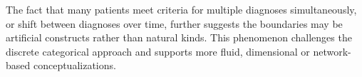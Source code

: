\documentclass[a4paper]{article}
\begin{document}
The fact that many patients meet criteria for multiple diagnoses simultaneously, or shift between diagnoses over time, further suggests the boundaries may be artificial constructs rather than natural kinds. This phenomenon challenges the discrete categorical approach and supports more fluid, dimensional or network-based conceptualizations.

\printbibliography
\end{document}
